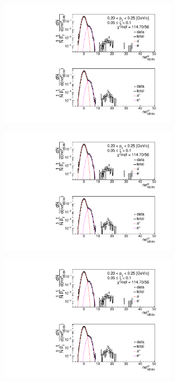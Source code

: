 \begin{figure}[h!]
\begin{subfigure}{.33\textwidth}
		\includegraphics[width=\linewidth, page=5]{chapters/chrgSTAR/img/dEdx/fit2019_secondStep_0_1.pdf}
	\end{subfigure}
	\begin{subfigure}{.3\textwidth}
		\includegraphics[width=\linewidth, page=6]{chapters/chrgSTAR/img/dEdx/fit2019_secondStep_0_1.pdf}
	\end{subfigure}
	\begin{subfigure}{.33\textwidth}
		\includegraphics[width=\linewidth, page=7]{chapters/chrgSTAR/img/dEdx/fit2019_secondStep_0_1.pdf}

\end{subfigure}
\end{figure}
